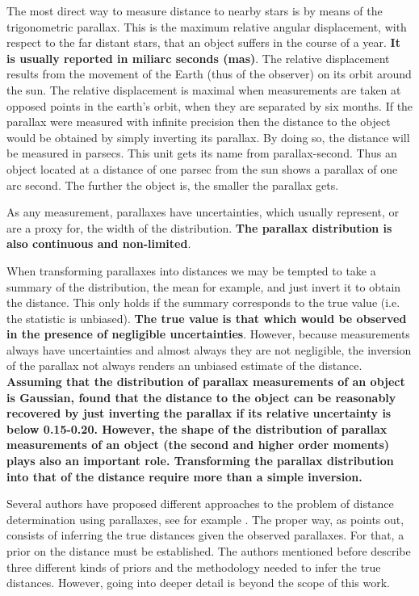 The most direct way to measure distance to nearby stars is by means of the trigonometric parallax. This is the maximum relative angular displacement, with respect to the far distant stars, that an object suffers in the course of a year. \textbf{It is usually reported in miliarc seconds (mas)}. The relative displacement results from the movement of the Earth (thus of the observer) on its orbit around the sun. The relative displacement is maximal when measurements are taken at opposed points in the earth's orbit, when they are separated by six months. If the parallax were measured with infinite precision then the distance to the object would be obtained by simply inverting its parallax. By doing so, the distance will be measured in parsecs. This unit gets its name from parallax-second. Thus an object located at a distance of one parsec from the sun shows a parallax of one arc second. The further the object is, the smaller the parallax gets.

As any measurement, parallaxes have uncertainties, which usually represent, or are a proxy for, the width of the distribution. \textbf{The parallax distribution is also continuous and non-limited}. 

When transforming parallaxes into distances we may be tempted to take a summary of the distribution, the mean for example, and just invert it to obtain the distance. This only holds if the summary corresponds to the true value (i.e. the statistic is unbiased). \textbf{The true value is that which would be observed in the presence of negligible uncertainties}. However, because measurements always have uncertainties and almost always they are not negligible, the inversion of the parallax not always renders an unbiased estimate of the distance. \textbf{Assuming that the distribution of parallax measurements of an object is Gaussian, \citet{Lutz1973} found that the distance to the object can be reasonably recovered by just inverting the parallax if its relative uncertainty is below 0.15-0.20. However, the shape of the distribution of parallax measurements of an object (the second and higher order moments) plays also an important role. Transforming the parallax distribution into that of the distance require more than a simple inversion.}  

Several authors have proposed different approaches to the problem of distance determination using parallaxes, see for example \citet{Lutz1973,2015PASP..127..994B,2016ApJ...832..137A,2016ApJ...833..119A}. The proper way, as \citet{2015PASP..127..994B} points out, consists of inferring the true distances given the observed parallaxes. For that, a prior on the distance must be established. The authors mentioned before describe three different kinds of priors and the methodology needed to infer the true distances. However, going into deeper detail is beyond the scope of this work.

